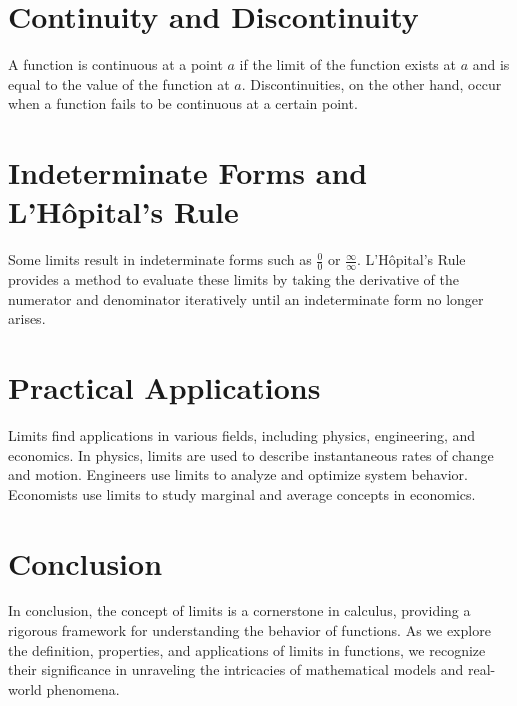 \documentclass{article}
\begin{document}
\section*{Continuity and Discontinuity}
A function is continuous at a point $a$ if the limit of the function exists at $a$ and is equal to the value of the function at $a$. Discontinuities, on the other hand, occur when a function fails to be continuous at a certain point.

\section*{Indeterminate Forms and L'Hôpital's Rule}
Some limits result in indeterminate forms such as $\frac{0}{0}$ or $\frac{\infty}{\infty}$. L'Hôpital's Rule provides a method to evaluate these limits by taking the derivative of the numerator and denominator iteratively until an indeterminate form no longer arises.

\section*{Practical Applications}
Limits find applications in various fields, including physics, engineering, and economics. In physics, limits are used to describe instantaneous rates of change and motion. Engineers use limits to analyze and optimize system behavior. Economists use limits to study marginal and average concepts in economics.

\section*{Conclusion}
In conclusion, the concept of limits is a cornerstone in calculus, providing a rigorous framework for understanding the behavior of functions. As we explore the definition, properties, and applications of limits in functions, we recognize their significance in unraveling the intricacies of mathematical models and real-world phenomena.
\end{document}
